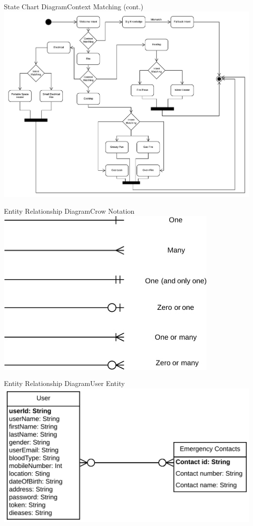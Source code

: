 \documentclass{beamer}
\begin{document}
\begin{frame}{State Chart Diagram}{Context Matching (cont.)}
    \includegraphics[width=\linewidth]{img3/state2.pdf}
\end{frame}

\begin{frame}{Entity Relationship Diagram}{Crow Notation}
    \includegraphics[width=.92\linewidth]{img3/ERD-Notation.jpg}
\end{frame}

\begin{frame}{Entity Relationship Diagram}{User Entity}
    \includegraphics[width=.92\linewidth]{img3/erd1.pdf}
\end{frame}
\end{document}
